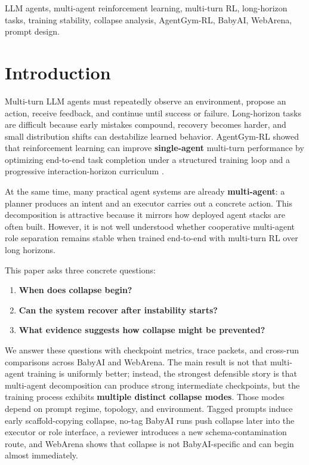 \documentclass{ieeeaccess}
\begin{document}
\begin{keywords}
LLM agents, multi-agent reinforcement learning, multi-turn RL, long-horizon tasks, training stability, collapse analysis, AgentGym-RL, BabyAI, WebArena, prompt design.
\end{keywords}

\titlepgskip=-21pt
\maketitle

\section{Introduction}
Multi-turn LLM agents must repeatedly observe an environment, propose an action, receive feedback, and continue until success or failure. Long-horizon tasks are difficult because early mistakes compound, recovery becomes harder, and small distribution shifts can destabilize learned behavior. AgentGym-RL showed that reinforcement learning can improve \textbf{single-agent} multi-turn performance by optimizing end-to-end task completion under a structured training loop and a progressive interaction-horizon curriculum \cite{agentgymrl2025}.

At the same time, many practical agent systems are already \textbf{multi-agent}: a planner produces an intent and an executor carries out a concrete action. This decomposition is attractive because it mirrors how deployed agent stacks are often built. However, it is not well understood whether cooperative multi-agent role separation remains stable when trained end-to-end with multi-turn RL over long horizons.

This paper asks three concrete questions:
\begin{enumerate}
\item \textbf{When does collapse begin?}
\item \textbf{Can the system recover after instability starts?}
\item \textbf{What evidence suggests how collapse might be prevented?}
\end{enumerate}

We answer these questions with checkpoint metrics, trace packets, and cross-run comparisons across BabyAI and WebArena. The main result is not that multi-agent training is uniformly better; instead, the strongest defensible story is that multi-agent decomposition can produce strong intermediate checkpoints, but the training process exhibits \textbf{multiple distinct collapse modes}. Those modes depend on prompt regime, topology, and environment. Tagged prompts induce early scaffold-copying collapse, no-tag BabyAI runs push collapse later into the executor or role interface, a reviewer introduces a new schema-contamination route, and WebArena shows that collapse is not BabyAI-specific and can begin almost immediately.
\end{document}
